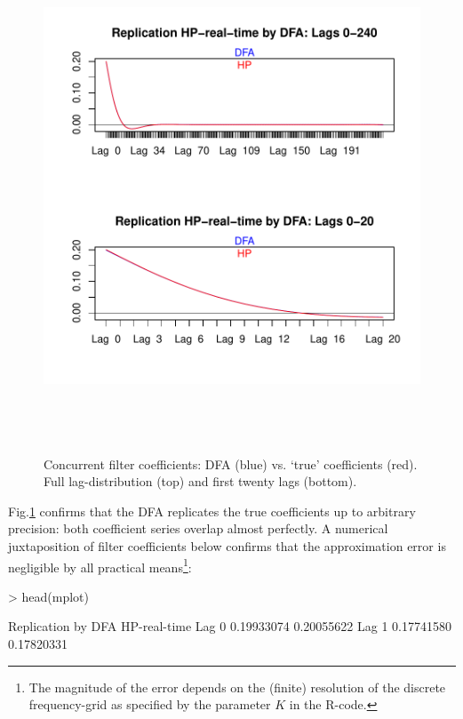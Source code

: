 \documentclass[a4paper]{book}
\begin{document}
\begin{enumerate}
\begin{figure}[H]\begin{center}\includegraphics[height=6in, width=6in]{z_HP_filt_coef}\caption{Concurrent filter coefficients: DFA (blue) vs. `true' coefficients (red). Full lag-distribution (top) and first twenty lags (bottom).\label{z_HP_filt_coef}}\end{center}\end{figure}Fig.\ref{z_HP_filt_coef} confirms that the DFA replicates the true coefficients up to arbitrary precision: both coefficient series overlap almost perfectly. A numerical juxtaposition of filter coefficients below confirms that the approximation error is negligible by all practical means\footnote{The magnitude of the error depends on the (finite) resolution of the discrete frequency-grid as specified by the parameter $K$ in the R-code.}:
\begin{Schunk}
\begin{Sinput}
> head(mplot)
\end{Sinput}
\begin{Soutput}
       Replication by DFA HP-real-time
Lag  0         0.19933074   0.20055622
Lag  1         0.17741580   0.17820331

\end{Soutput}
\end{Schunk}
\end{enumerate}
\end{document}
